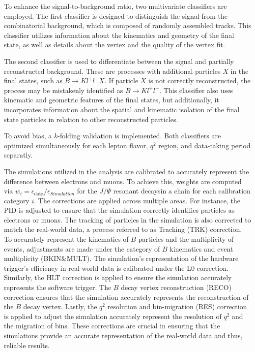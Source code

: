 To enhance the signal-to-background ratio, two multivariate classifiers are employed. The 
first classifier is designed to distinguish the signal from the combinatorial background, 
which is composed of randomly assembled tracks. This classifier utilizes information about 
the kinematics and geometry of the final state, as well as details about the vertex and the 
quality of the vertex fit.

The second classifier is used to differentiate between the signal and partially reconstructed 
background. These are processes with additional particles $X$ in the final states, such as 
$B\to K l^+l^- X$. If particle $X$ is not correctly reconstructed, the process may be mistakenly 
identified as $B \to K l^+l^-$. This classifier also uses kinematic and geometric features of 
the final states, but additionally, it incorporates information about the spatial and kinematic 
isolation of the final state particles in relation to other reconstructed particles.

To avoid bias, a $k$-folding validation is implemented. Both classifiers are optimized 
simultaneously for each lepton flavor, $q^2$ region, and data-taking period separatly.


The simulations utilized in the analysis are calibrated to accurately represent the difference 
between electrons and muons. To achieve this, weights are computed via 
$w_i=\epsilon_\text{data}/\epsilon_{Simulation}$ for the $J/\Psi$ resonant decaysin a chain 
for each calibration category $i$. 
The corrections are applied across multiple areas. For instance, the PID is adjusted to ensure 
that the simulation correctly identifies particles as electrons or muons. The tracking of 
particles in the simulation is also corrected to match the real-world data, a process referred 
to as Tracking (TRK) correction.
To accurately represent the kinematics of $B$ particles and the multiplicity of events, adjustments 
are made under the category of $B$ kinematics and event multiplicity (BKIN\&MULT). The simulation's
representation of the hardware trigger's efficiency in real-world data is calibrated under the 
L0 correction.
Similarly, the HLT correction is applied to ensure the simulation accurately represents the software 
trigger. The $B$ decay vertex reconstruction (RECO) correction ensures that the simulation accurately 
represents the reconstruction of the $B$ decay vertex.
Lastly, the $q^2$ resolution and bin-migration (RES) correction is applied to adjust the simulation 
accurately represent the resolution of $q^2$ and the migration of bins. These corrections are crucial 
in ensuring that the simulations provide an accurate representation of the real-world data and thus, 
reliable results.

